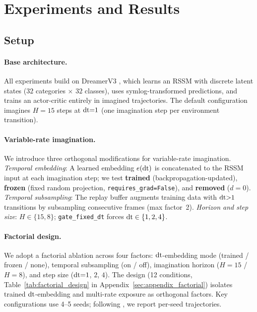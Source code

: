 \section{Experiments and Results}
\label{sec:experiments}

\subsection{Setup}
\label{sec:methodology}

\paragraph{Base architecture.}
 All experiments build on DreamerV3 \citep{hafner2025dreamerv3}, which learns an RSSM with discrete latent states ($32$ categories $\times$ $32$ classes), uses symlog-transformed predictions, and trains an actor-critic entirely in imagined trajectories. The default configuration imagines $H{=}15$ steps at $\mathrm{dt}{=}1$ (one imagination step per environment transition).

\paragraph{Variable-rate imagination.}
\label{sec:variable_rate}
 We introduce three orthogonal modifications for variable-rate imagination.
\emph{Temporal embedding}: A learned embedding $e(\mathrm{dt})$ is concatenated to the RSSM input at each imagination step; we test \textbf{trained} (backpropagation-updated), \textbf{frozen} (fixed random projection, \texttt{requires\_grad=False}), and \textbf{removed} ($d{=}0$).
\emph{Temporal subsampling}: The replay buffer augments training data with $\mathrm{dt}{>}1$ transitions by subsampling consecutive frames (max factor~2).
\emph{Horizon and step size}: $H \in \{15, 8\}$; \texttt{gate\_fixed\_dt} forces $\mathrm{dt} \in \{1, 2, 4\}$.

\paragraph{Factorial design.}
\label{sec:factorial}
 We adopt a factorial ablation across four factors: $\mathrm{dt}$-embedding mode (trained / frozen / none), temporal subsampling (on / off), imagination horizon ($H{=}15$ / $H{=}8$), and step size ($\mathrm{dt}{=}1$, $2$, $4$). The design (12 conditions, Table~\ref{tab:factorial_design} in Appendix~\ref{sec:appendix_factorial}) isolates trained $\mathrm{dt}$-embedding and multi-rate exposure as orthogonal factors. Key configurations use 4--5 seeds; following \citet{agarwal2021precipice}, we report per-seed trajectories.

